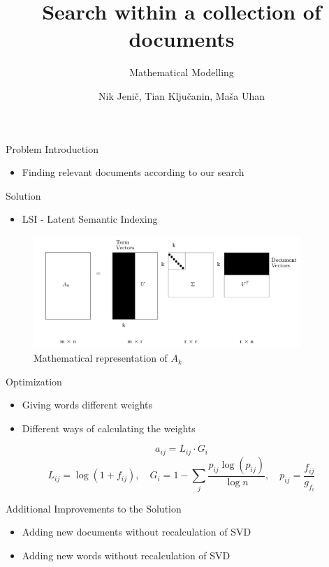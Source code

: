 \documentclass{beamer}
\title{Search within a collection of documents}
\subtitle{Mathematical Modelling}
\author{Nik Jenič, Tian Ključanin, Maša Uhan}
\date{}
\begin{document}
\frame{\titlepage}

\begin{frame}{Problem Introduction}
    \begin{itemize}
        \item Finding relevant documents according to our search
    \end{itemize}
\end{frame}

\begin{frame}{Solution}
    \begin{itemize}
        \item LSI - Latent Semantic Indexing
    \end{itemize}
    \begin{figure}
        \centering
        \includegraphics[width=0.9\textwidth]{../Slike/svd.png}
        \caption{Mathematical representation of $A_k$}
        \label{fig:matrixA}
      \end{figure}
\end{frame}

\begin{frame}{Optimization}
    \begin{itemize}
        \item Giving words different weights
        \item Different ways of calculating the weights
    \end{itemize}
    \begin{center}
        \[
            a_{ij} = L_{ij} \cdot G_i
        \]
        \[
            L_{ij} = \log (1 + f_{ij}), \quad G_i = 1 - \sum_{j} \frac{p_{ij} \log (p_{ij})}{\log n}, \quad p_{ij} = \frac{f_{ij}}{g_{f_i}}
        \]
    \end{center}
\end{frame}

\begin{frame}{Additional Improvements to the Solution}
    \begin{itemize}
        \item Adding new documents without recalculation of SVD
        \item Adding new words without recalculation of SVD
    \end{itemize}
\end{frame}
\end{document}
